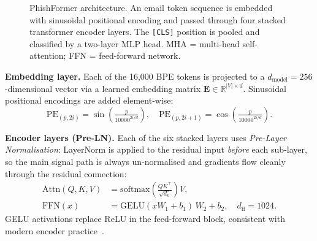 \documentclass[sigconf, nonacm]{acmart}
\begin{document}
\begin{figure}[h]
\caption{PhishFormer architecture. An email token sequence is embedded
  with sinusoidal positional encoding and passed through four stacked
  transformer encoder layers. The \texttt{[CLS]} position is pooled
  and classified by a two-layer MLP head. MHA = multi-head
  self-attention; FFN = feed-forward network.}
\label{fig:arch}
\end{figure}

\textbf{Embedding layer.}
Each of the 16{,}000 BPE tokens is projected to a
$d_\text{model}=256$-dimensional vector via a learned embedding
matrix $\mathbf{E}\in\mathbb{R}^{|V|\times d}$.
Sinusoidal positional encodings are added element-wise:
\begin{equation}
\mathrm{PE}_{(p,2i)}=\sin\!\left(\tfrac{p}{10000^{2i/d}}\right),\quad
\mathrm{PE}_{(p,2i+1)}=\cos\!\left(\tfrac{p}{10000^{2i/d}}\right).
\label{eq:pe}
\end{equation}

\textbf{Encoder layers (Pre-LN).}
Each of the six stacked layers uses \emph{Pre-Layer Normalisation}:
LayerNorm is applied to the residual input \emph{before} each
sub-layer, so the main signal path is always un-normalised and
gradients flow cleanly through the residual connection:
\begin{align}
\mathrm{Attn}(Q,K,V)
  &= \mathrm{softmax}\!\!\left(\frac{QK^\top}{\sqrt{d_k}}\right)\!V,
\label{eq:attn}\\
\mathrm{FFN}(x)
  &= \mathrm{GELU}(xW_1+b_1)\,W_2+b_2,
     \quad d_\text{ff}=1024.
\label{eq:ffn}
\end{align}
GELU activations replace ReLU in the feed-forward block, consistent
with modern encoder practice~\cite{devlin2019}.
\end{document}
